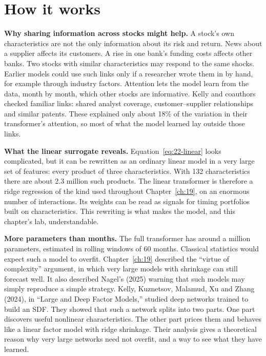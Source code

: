 \section{How it works}
\label{sec:22-how}

\textbf{Why sharing information across stocks might help.} A stock's own characteristics are not the only information about its risk and return. News about a supplier affects its customers. A rise in one bank's funding costs affects other banks. Two stocks with similar characteristics may respond to the same shocks. Earlier models could use such links only if a researcher wrote them in by hand, for example through industry factors. Attention lets the model learn from the data, month by month, which other stocks are informative. Kelly and coauthors checked familiar links: shared analyst coverage, customer--supplier relationships and similar patents. These explained only about 18\% of the variation in their transformer's attention, so most of what the model learned lay outside those links.

\textbf{What the linear surrogate reveals.} Equation~\eqref{eq:22-linear} looks complicated, but it can be rewritten as an ordinary linear model in a very large set of features: every product of three characteristics. With 132 characteristics there are about 2.3 million such products. The linear transformer is therefore a ridge regression of the kind used throughout Chapter~\ref{ch:19}, on an enormous number of interactions. Its weights can be read as signals for timing portfolios built on characteristics. This rewriting is what makes the model, and this chapter's lab, understandable.

\textbf{More parameters than months.} The full transformer has around a million parameters, estimated in rolling windows of 60 months. Classical statistics would expect such a model to overfit. Chapter~\ref{ch:19} described the ``virtue of complexity'' argument, in which very large models with shrinkage can still forecast well. It also described Nagel's (2025) warning that such models may simply reproduce a simple strategy. Kelly, Kuznetsov, Malamud, Xu and Zhang (2024), in ``Large and Deep Factor Models,'' studied deep networks trained to build an SDF. They showed that such a network splits into two parts. One part discovers useful nonlinear characteristics. The other part prices them and behaves like a linear factor model with ridge shrinkage. Their analysis gives a theoretical reason why very large networks need not overfit, and a way to see what they have learned.

